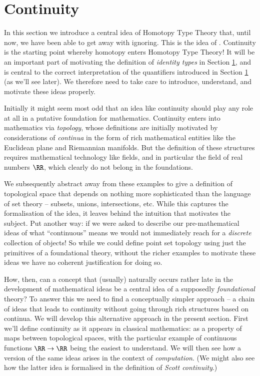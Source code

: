 \section{Continuity}

In this section we introduce a central idea of Homotopy Type Theory that, until now, we have been able to get away with ignoring.  This is the idea of .  Continuity is the starting point whereby homotopy enters Homotopy Type Theory!  It will be an important part of motivating the definition of \emph{identity types} in Section \ref{}, and is central to the correct interpretation of the quantifiers introduced in Section \ref{} (as we'll see later).  We therefore need to take care to introduce, understand, and motivate these ideas properly.

Initially it might seem most odd that an idea like continuity should play any role at all in a putative foundation for mathematics.
Continuity enters into mathematics via \emph{topology}, whose definitions are initially motivated by considerations of \emph{continua} in the form of rich mathematical entities like the Euclidean plane and Riemannian manifolds.
But the definition of these structures requires mathematical technology like fields, and in particular the field of real numbers $\RR$, which clearly do not belong in the foundations.

We subsequently abstract away from these examples to give a definition of topological space that depends on nothing more sophisticated than the language of set theory -- subsets, unions, intersections, etc.  While this captures the formalisation of the idea, it leaves behind the intuition that motivates the subject.  Put another way: if we were asked to describe our pre-mathematical ideas of what ``continuous'' means we would not immediately reach for a \emph{discrete} collection of objects!
So while we could define point set topology using just the primitives of a foundational theory, without the richer examples to motivate these ideas we have no coherent justification for doing so.

How, then, can a concept that (usually) naturally occurs rather late in the development of mathematical ideas be a central idea of a supposedly \emph{foundational} theory?
To answer this we need to find a conceptually simpler approach -- a chain of ideas that leads to continuity without going through rich structures based on continua.  We will develop this alternative approach in the present section.
First we'll define continuity as it appears in classical mathematics: as a property of maps between topological spaces, with the particular example of continuous functions $\RR \to \RR$ being the easiest to understand.  We will then see how a version of the same ideas arises in the context of \emph{computation}.  (We might also see how the latter idea is formalised in the definition of \emph{Scott continuity}.)



